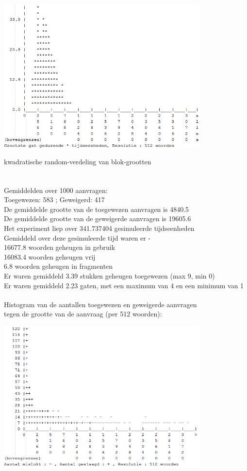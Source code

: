 \documentclass[a4paper]{article}
\begin{document}
			\begin{center}
				\includegraphics[width=0.8\textwidth]{wf4.png}
			\end{center}
			kwadratische random-verdeling van blok-grootten\\
			\\
			\\
			Gemiddelden over 1000 aanvragen:\\
			Toegewezen: 583 ; Geweigerd: 417\\
			De gemiddelde grootte van de toegewezen aanvragen is 4840.5\\
			De gemiddelde grootte van de geweigerde aanvragen is 19605.6\\
			Het experiment liep over 341.737404 gesimuleerde tijdseenheden\\
			Gemiddeld over deze gesimuleerde tijd waren er - \\
			 16677.8 woorden geheugen in gebruik\\
			 16083.4 woorden geheugen vrij\\
			     6.8 woorden geheugen in fragmenten\\
			Er waren gemiddeld     3.39 stukken geheugen toegewezen (max 9, min 0)\\
			Er waren gemiddeld     2.23 gaten, met een maximum van 4 en een minimum van 1\\
			\\
			Histogram van de aantallen toegewezen en geweigerde aanvragen\\
			tegen de grootte van de aanvraag (per 512 woorden):
			\begin{center}
				\includegraphics[width=0.8\textwidth]{wf5.png}
			\end{center}
\end{document}
